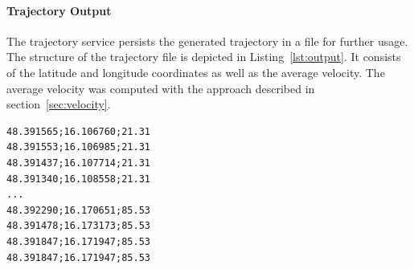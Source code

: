 \documentclass[master,english]{hgbthesis}
\begin{document}
\paragraph{Trajectory Output}
The trajectory service persists the generated trajectory in a file for further usage. The structure of the trajectory file is depicted in Listing~\ref{lst:output}. It consists of the latitude and longitude coordinates as well as the average velocity. The average velocity was computed with the approach described in section~\ref{sec:velocity}.
\begin{lstlisting}[style=BashInputStyle,caption={Coverage prediction},label={lst:output}]
48.391565;16.106760;21.31
48.391553;16.106985;21.31             
48.391437;16.107714;21.31
48.391340;16.108558;21.31
...
48.392290;16.170651;85.53
48.391478;16.173173;85.53
48.391847;16.171947;85.53
48.391847;16.171947;85.53
\end{lstlisting}
\end{document}
